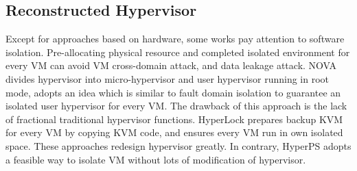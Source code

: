 \documentclass[conference]{IEEEtran}
\begin{document}
\subsection{Reconstructed Hypervisor }
Except for approaches based on hardware, some works\cite{nexen,Steinberg2010NOVA,hyperlock} pay attention to software isolation. Pre-allocating physical resource and completed isolated environment for every VM can avoid VM cross-domain attack, and data leakage attack. NOVA\cite{Steinberg2010NOVA} divides hypervisor into micro-hypervisor and user hypervisor running in root mode, adopts an idea which is similar to fault domain isolation to guarantee an isolated user hypervisor for every VM. The drawback of this approach is the lack of fractional traditional hypervisor functions. HyperLock \cite{hyperlock} prepares backup KVM for every VM by copying KVM code, and ensures every VM run in own isolated space. 
These approaches redesign hypervisor greatly. In contrary, HyperPS adopts a feasible way to isolate VM without lots of modification of hypervisor. 
\end{document}
